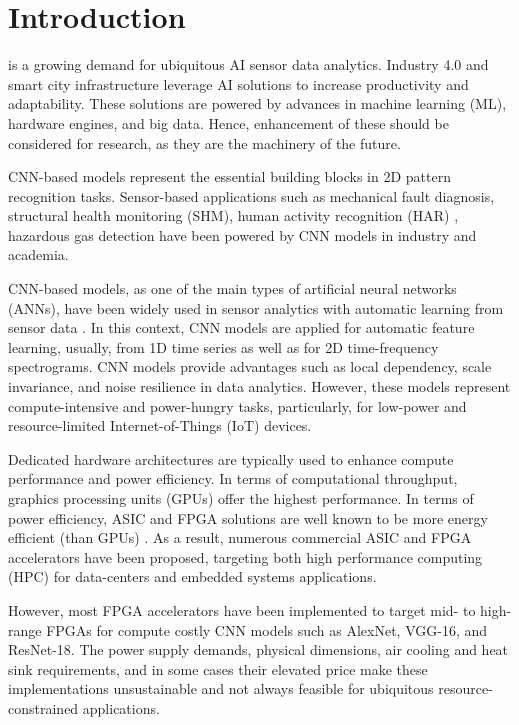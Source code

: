 
\section{Introduction}
\label{sec:introduction}
 is a growing demand for ubiquitous AI sensor data analytics. Industry 4.0 and smart city infrastructure leverage AI solutions to increase productivity and adaptability\cite{lom2016industry}. These solutions are powered by advances in machine learning (ML), hardware engines, and big data. Hence, enhancement of these should be considered for research, as they are the machinery of the future.

CNN-based models represent the essential building blocks in 2D pattern recognition tasks. Sensor-based applications such as mechanical fault diagnosis\cite{li2019sensor,dong2018rolling}, structural health monitoring (SHM)\cite{nagayama2007structural}, human activity recognition (HAR) \cite{wang2019deep}, hazardous gas detection\cite{kim2017hazardous} have been powered by CNN models in industry and academia.

CNN-based models, as one of the main types of artificial neural networks (ANNs),
have been widely used in sensor analytics with automatic learning from sensor data \cite{ince2016real, janssens2016convolutional, abdeljaber2017real, guo2016hierarchical}. In this context, CNN models are applied for automatic feature learning, usually, from 1D time series as well as for 2D time-frequency spectrograms. CNN models provide advantages such as local dependency, scale invariance, and noise resilience in data analytics. However, these models represent compute-intensive and power-hungry tasks, particularly, for low-power and resource-limited Internet-of-Things (IoT) devices.

Dedicated hardware architectures are typically used to enhance compute performance and power efficiency. In terms of computational throughput, graphics processing units (GPUs) offer the highest performance. In terms of power efficiency, ASIC and FPGA solutions are well known to be more energy efficient (than GPUs) \cite{nurvitadhi2017can}. As a result, numerous commercial ASIC and FPGA accelerators have been proposed, targeting both high performance computing (HPC) for data-centers and embedded systems applications.

However, most FPGA accelerators have been implemented to target mid- to high-range FPGAs for compute costly CNN models such as AlexNet, VGG-16, and ResNet-18. The power supply demands, physical dimensions, air cooling and heat sink requirements, and in some cases their elevated price make these implementations unsustainable and not always feasible for ubiquitous resource-constrained applications.

